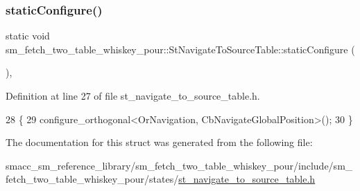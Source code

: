 \subsubsection{\texorpdfstring{static\+Configure()}{staticConfigure()}}
{\footnotesize\ttfamily static void sm\+\_\+fetch\+\_\+two\+\_\+table\+\_\+whiskey\+\_\+pour\+::\+St\+Navigate\+To\+Source\+Table\+::static\+Configure (\begin{DoxyParamCaption}{ }\end{DoxyParamCaption})\hspace{0.3cm}{\ttfamily [inline]}, {\ttfamily [static]}}



Definition at line 27 of file st\+\_\+navigate\+\_\+to\+\_\+source\+\_\+table.\+h.


\begin{DoxyCode}
28         \{
29             configure\_orthogonal<OrNavigation, CbNavigateGlobalPosition>();
30         \}
\end{DoxyCode}


The documentation for this struct was generated from the following file\+:\begin{DoxyCompactItemize}
\item 
smacc\+\_\+sm\+\_\+reference\+\_\+library/sm\+\_\+fetch\+\_\+two\+\_\+table\+\_\+whiskey\+\_\+pour/include/sm\+\_\+fetch\+\_\+two\+\_\+table\+\_\+whiskey\+\_\+pour/states/\hyperlink{sm__fetch__two__table__whiskey__pour_2include_2sm__fetch__two__table__whiskey__pour_2states_2st__navigate__to__source__table_8h}{st\+\_\+navigate\+\_\+to\+\_\+source\+\_\+table.\+h}\end{DoxyCompactItemize}
